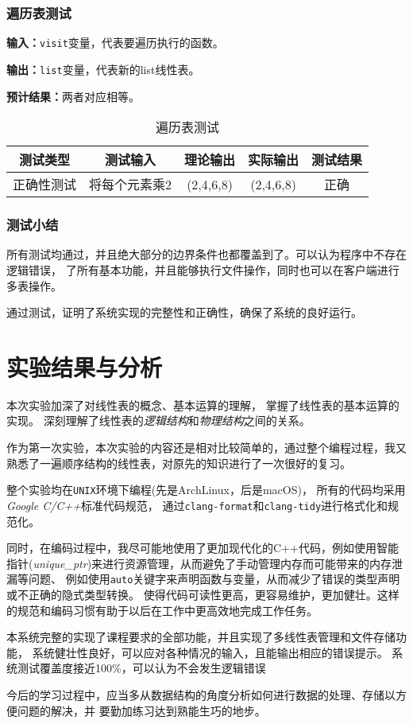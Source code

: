 \subsubsection{遍历表测试}
\textbf{输入：}\texttt{visit}变量，代表要遍历执行的函数。
\par
\textbf{输出：}\texttt{list}变量，代表新的list线性表。
\par
\textbf{预计结果：}两者对应相等。
\begin{table}[h]
    \caption{遍历表测试}
    \centering
    \begin{tabular}{@{}ccccc@{}}
        \toprule
        \multicolumn{1}{c}{测试类型}    & \multicolumn{1}{c}{测试输入} & \multicolumn{1}{c}{理论输出} & \multicolumn{1}{c}{实际输出} &
        \multicolumn{1}{c}{测试结果} \\ \midrule
        \multicolumn{1}{c|}{正确性测试}  & 将每个元素乘2&(2,4,6,8)&(2,4,6,8)&正确\\ \bottomrule
    \end{tabular}
    \label{tab:traversetest1}
\end{table}

\subsubsection{测试小结}
所有测试均通过，并且绝大部分的边界条件也都覆盖到了。可以认为程序中不存在逻辑错误，
了所有基本功能，并且能够执行文件操作，同时也可以在客户端进行多表操作。
\par
通过测试，证明了系统实现的完整性和正确性，确保了系统的良好运行。

\section{实验结果与分析}\label{sec:4}
本次实验加深了对线性表的概念、基本运算的理解，
掌握了线性表的基本运算的实现。
深刻理解了线性表的\emph{逻辑结构}和\emph{物理结构}之间的关系。
\par
作为第一次实验，本次实验的内容还是相对比较简单的，通过整个编程过程，我又熟悉了一遍顺序结构的线性表，对原先的知识进行了一次很好的复习。
\par 整个实验均在\texttt{UNIX}环境下编程(先是ArchLinux，后是macOS)，
所有的代码均采用\emph{Google C/C++}标准代码规范，
通过\texttt{clang-format}和\texttt{clang-tidy}进行格式化和规范化。
\par
同时，在编码过程中，我尽可能地使用了更加现代化的C++代码，例如使用智能指针(\textit{unique\_ptr})来进行资源管理，从而避免了手动管理内存而可能带来的内存泄漏等问题、
例如使用\texttt{auto}关键字来声明函数与变量，从而减少了错误的类型声明或不正确的隐式类型转换。
使得代码可读性更高，更容易维护，更加健壮。这样的规范和编码习惯有助于以后在工作中更高效地完成工作任务。
\par
本系统完整的实现了课程要求的全部功能，并且实现了多线性表管理和文件存储功能，
系统健壮性良好，可以应对各种情况的输入，且能输出相应的错误提示。
系统测试覆盖度接近100\%，可以认为不会发生逻辑错误
\par
今后的学习过程中，应当多从数据结构的角度分析如何进行数据的处理、存储以方便问题的解决，并 要勤加练习达到熟能生巧的地步。

